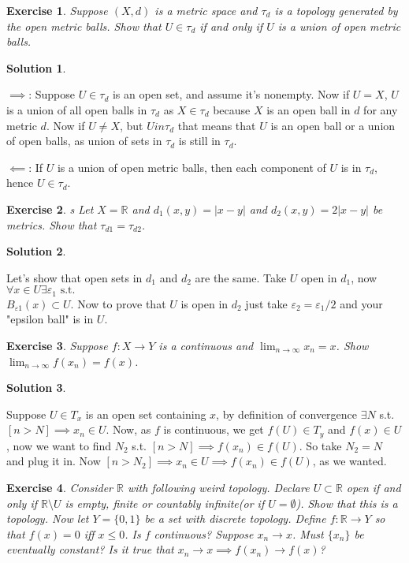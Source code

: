\documentclass[11pt,a4paper]{article}
\newtheorem{Ex}{Exercise}
\newtheorem{Sol}{Solution}
\begin{document}
\begin{Ex}
	Suppose $(X, d)$ is a metric space and $\tau_d$ is a topology generated by the open metric balls. Show that $U \in \tau_d$ if and only if $U$ is a union of open metric balls.
\end{Ex}

\begin{Sol} \end{Sol}
\noindent$\implies$: Suppose $U \in \tau_d$ is an open set, and assume it's nonempty. Now if $U = X$, $U$ is a union of all open balls in $\tau_d$ as $X \in \tau_d$ because $X$ is an open ball in $d$ for any metric $d$. Now if $U \neq X$, but $U in \tau_d$ that means that $U$ is an open ball or a union of open balls, as union of sets in $\tau_d$ is still in $\tau_d$.

$\impliedby$: If $U$ is a union of open metric balls, then each component of $U$ is in $\tau_d$, hence $U \in \tau_d$.

\begin{Ex}
s	Let $X = \mathbb{R}$ and $d_1(x,y) = |x-y|$ and $d_2(x,y) = 2|x-y|$ be metrics. Show that $\tau_{d1} = \tau_{d2}$. 
\end{Ex}

\begin{Sol} \end{Sol}
\noindent Let's show that open sets in $d_1$ and $d_2$ are the same. Take $U$ open in $d_1$, now $\forall x \in U \exists \varepsilon_1 \text{ s.t. }$ \\$B_{\varepsilon1}(x) \subset U$. Now to prove that $U$ is open in $d_2$ just take $\varepsilon_2 = \varepsilon_1/2$ and your "epsilon ball" is in $U$. 

\begin{Ex}
	Suppose $f: X \rightarrow Y$ is a continuous and $\lim_{n \rightarrow \infty}x_n = x$. Show $\lim_{n \rightarrow \infty}f(x_n) = f(x)$.
\end{Ex}
\begin{Sol} \end{Sol} 
\noindent Suppose $U \in T_x$ is an open set containing $x$, by definition of convergence $\exists N$ s.t. $[n > N] \implies x_n \in U$. Now, as $f$ is continuous, we get $f(U) \in T_y$ and $f(x) \in U$, now we want to find $N_2$ s.t. $[n > N] \implies f(x_n) \in f(U)$. So take $N_2 = N$ and plug it in. Now $[n > N_2] \implies x_n \in U \implies f(x_n) \in f(U)$, as we wanted. \\

\begin{Ex}
	Consider $\mathbb{R}$ with following weird topology. Declare $U \subset \mathbb{R}$ open if and only if $\mathbb{R} \setminus U$ is empty, finite or countably infinite(or if $U = \emptyset$). Show that this is a topology. Now let $Y = \{0,1\}$ be a set with discrete topology. Define $f: \mathbb{R} \rightarrow Y$ so that $f(x) = 0$ iff $x \le 0$. Is $f$ continuous? Suppose $x_n \rightarrow x$. Must $\{x_n\}$ be eventually constant? Is it true that $x_n \rightarrow x \implies f(x_n) \rightarrow f(x)$? 
\end{Ex}
\end{document}
